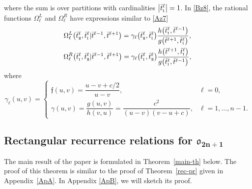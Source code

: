 \documentclass[10pt,a4paper]{amsart}
\newcommand{\so}{\scriptscriptstyle \rm I}
\newcommand{\st}{\scriptscriptstyle \rm I\hspace{-1pt}I}
\newcommand{\bt}{{\bar t}}
\theoremstyle{definition}
\def\r#1{\eqref{#1}}
\def\fgo{\mathfrak{f}}
\def\Oml{\Omega^L}
\def\Omr{\Omega^R}
\begin{document}
\pagebreak

\noindent
where the sum is over partitions with cardinalities $\big|\bt^\ell_{\so}\big|=1$.
In \r{Bz8}, the rational functions
$\Oml_\ell$ and
$\Omr_\ell$ have
expressions similar to \r{Az7}
\begin{gather}
\Oml_\ell\bigl(\bt^\ell_{\st},\bt^\ell_{\so}|\bt^{\ell-1},\bt^{\ell+1}\bigr)=
\gamma_\ell\bigl(\bt^\ell_{\st},\bt^\ell_{\so}\bigr)
 \frac{h\bigl(\bt^\ell_{\so},\bt^{\ell-1}\bigr)}{g\bigl(\bt^{\ell+1},\bt^\ell_{\so}\bigr)},\nonumber\\
\Omr_\ell\bigl(\bt^\ell_{\so},\bt^\ell_{\st}|\bt^{\ell-1},\bt^{\ell+1}\bigr)=
\gamma_\ell\bigl(\bt^\ell_{\so},\bt^\ell_{\st}\bigr)
 \frac{h\bigl(\bt^{\ell+1},\bt^\ell_{\so}\bigr)}{g\bigl(\bt^\ell_{\so},\bt^{\ell-1}\bigr)} ,\label{Bz10}
\end{gather}
where
\[%
\gamma_\ell(u,v)=
\begin{cases}
\fgo(u,v)=\dfrac{u-v+c/2}{u-v},&\ell=0,\\
\gamma(u,v)=\dfrac{g(u,v)}{h(v,u)}=\dfrac{c^2}{(u-v)(v-u+c)},
&\ell=1,\dots,n-1.
\end{cases}
\]


\subsection[Rectangular recurrence relations for o\_2n+1]{Rectangular recurrence relations for $\boldsymbol{\mathfrak{o}_{2n+1}}$}\label{sect:rec-oN}

The main result of the paper is formulated in Theorem~\ref{main-th} below.
The proof of this theorem is similar to the proof of Theorem~\ref{rec-pr} given in Appendix~\ref{ApA}. In Appendix \ref{ApB}, we will sketch its proof.
\end{document}
